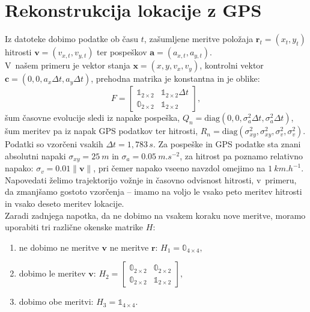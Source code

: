 \documentclass[a4paper,pdftex,10pt]{article}
\renewcommand{\vec}[1]{\boldsymbol{\mathbf{#1}}}
\numberwithin{figure}{section} %
\begin{document}
\section{Rekonstrukcija lokacije z GPS}
Iz datoteke  dobimo podatke ob času $t$, zašumljene meritve 
položaja $\vec{r}_t = (x_t, y_t)$ hitrosti $\vec{v} = (v_{x,t},v_{y,t})$ ter pospeškov 
$\vec{a} = (a_{x,t}, a_{y,t})$. \\
V~našem primeru je vektor stanja $\vec{x} = (x,y,v_x,v_y)$, kontrolni vektor $\vec{c}=
(0,0,a_x \Delta t, a_y \Delta t)$, prehodna matrika je konstantna in je oblike:
$$ F = 
\begin{bmatrix}
    \mathbb{1}_{2\times 2} & \mathbb{1}_{2\times 2} \Delta t \\
    \mathbb{0}_{2\times 2} & \mathbb{1}_{2\times 2} 
\end{bmatrix}, $$
šum časovne evolucije sledi iz napake pospeška, $Q_n = \mathrm{diag}(0,0,\sigma_a^2 
\Delta t, \sigma_a^2 \Delta t)$, šum meritev pa iz napak GPS podatkov ter hitrosti,
$R_n = \mathrm{diag}(\sigma_{xy}^2, \sigma_{xy}^2, \sigma_v^2, \sigma_v^2)$. \\
Podatki so vzorčeni vsakih $\Delta t =1,783 \, \si{s}$. Za pospeške in GPS podatke sta znani
absolutni napaki $\sigma_{xy} = \SI{25}{m}$ in $\sigma_a = \SI{0.05}{m.s^{-2}}$, za 
hitrost pa poznamo relativno napako: $\sigma_v = 0.01 \|\vec{v}\|$, pri čemer napako vseeno
navzdol omejimo na $\SI{1}{km.h^{-1}}$. \\
Napovedati želimo trajektorijo vožnje in časovno odvisnost hitrosti, v~primeru, da
zmanjšamo gostoto vzorčenja -- imamo na voljo le vsako peto meritev hitrosti in vsako
deseto meritev lokacije. \\
Zaradi zadnjega napotka, da ne dobimo na vsakem koraku nove meritve, moramo uporabiti
tri različne okenske matrike $H$:
\begin{enumerate}
    \item ne dobimo ne meritve $\vec{v}$ ne meritve $\vec{r}$: $H_1 = 
	\mathbb{0}_{4\times4},$ 
    \item dobimo le meritev $\vec{v}$: $H_2 = 
	\begin{bmatrix} 
	    \mathbb{0}_{2\times2} & \mathbb{0}_{2\times2}\\ 
	    \mathbb{0}_{2\times2} & \mathbb{1}_{2\times2} 
	\end{bmatrix},$ 
    \item dobimo obe meritvi: $ H_3 = \mathbb{1}_{4\times4}.$
\end{enumerate}
\end{document}
